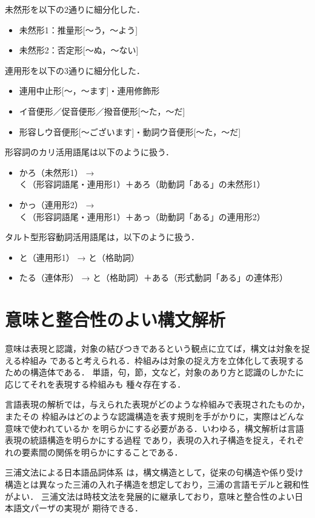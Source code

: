 \documentclass[japanese]{jnlp_1.2}
\begin{document}
\begin{enumerate}
未然形を以下の2通りに細分化した．
\begin{itemize}
\item 未然形1：推量形[〜う，〜よう]
\item 未然形2：否定形[〜ぬ，〜ない]
\end{itemize}
連用形を以下の3通りに細分化した．
\begin{itemize}
\item 連用中止形[〜，〜ます]・連用修飾形
\item イ音便形／促音便形／撥音便形[〜た，〜だ]
\item 形容しウ音便形[〜ございます]・動詞ウ音便形[〜た，〜だ]
\end{itemize}
形容詞のカリ活用語尾は以下のように扱う．
\begin{itemize}
\item かろ（未然形1） →\\
  く（形容詞語尾・連用形1）＋あろ（助動詞「ある」の未然形1）
\item かっ（連用形2） →\\
  く（形容詞語尾・連用形1）＋あっ（助動詞「ある」の連用形2）
\end{itemize}
タルト型形容動詞活用語尾は，以下のように扱う．
\begin{itemize}
\item と（連用形1） → と（格助詞）
\item たる（連体形） → と（格助詞）＋ある（形式動詞「ある」の連体形）
\end{itemize}

\end{enumerate}

\section{意味と整合性のよい構文解析}
意味は表現と認識，対象の結びつきであるという観点に立てば，構文は対象を捉える枠組み
であると考えられる．枠組みは対象の捉え方を立体化して表現するための構造体である．
単語，句，節，文など，対象のあり方と認識のしかたに応じてそれを表現する枠組みも
種々存在する．

言語表現の解析では，与えられた表現がどのような枠組みで表現されたものか，またその
枠組みはどのような認識構造を表す規則を手がかりに，実際はどんな意味で使われているか
を明らかにする必要がある．いわゆる，構文解析は言語表現の統語構造を明らかにする過程
であり，表現の入れ子構造を捉え，それぞれの要素間の関係を明らかにすることである．

三浦文法による日本語品詞体系
\cite{宮崎他1995}
は，構文構造として，従来の句構造や係り受け
構造とは異なった三浦の入れ子構造を想定しており，三浦の言語モデルと親和性がよい．
三浦文法は時枝文法を発展的に継承しており，意味と整合性のよい日本語文パーザの実現が
期待できる．
\end{document}
